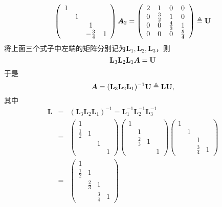 \begin{jie}
  $$
  \left(
    \begin{array}{cccc}
      1 & && \\
        &1&&\\
        &&1&\\
        &&-\frac34&1
    \end{array}
  \right)\boldsymbol{A}_2 = \left(
    \begin{array}{cccc}
      2 & 1 & 0 & 0\\
      0 & \frac32 & 1 & 0\\
      0 & 0 & \frac43 & 1\\
      0 & 0 & 0  & \frac54
    \end{array}
  \right) \triangleq \mathbf{U}
  $$
  将上面三个式子中左端的矩阵分别记为$\mathbf{L}_1,\mathbf{L}_2,\mathbf{L}_3$，则
  $$
  \mathbf{L}_3\mathbf{L}_2\mathbf{L}_1 \boldsymbol{A} = \mathbf{U}
  $$
  于是
  $$
  \boldsymbol{A} = (\mathbf{L}_3\mathbf{L}_2\mathbf{L}_1)^{-1}\mathbf{U} \triangleq \mathbf{L}\mathbf{U},
  $$
  其中
  $$
  \begin{array}{rcl}
    \mathbf{L}
    &=& (\mathbf{L}_3\mathbf{L}_2\mathbf{L}_1)^{-1} 
        =  \mathbf{L}_1^{-1}\mathbf{L}_2^{-1}\mathbf{L}_3^{-1}\\[0.2cm]
    &=&  
        \left(
        \begin{array}{cccc}
          1 & && \\
          \frac12 &1&&\\
            &&1&\\
            &&&1
        \end{array}
                \right)
                \left(
                \begin{array}{cccc}
                  1 & && \\
                    &1&&\\
                    &\frac23&1&\\
                    &&&1
                \end{array}
                        \right)
                        \left(
                        \begin{array}{cccc}
                          1 & && \\
                            &1&&\\
                            &&1&\\
                            &&\frac34&1
                        \end{array}
                                       \right) \\[0.6cm]
    &=&   \left(
        \begin{array}{cccc}
          1 & && \\
          \frac12 &1&&\\
            &\frac23&1&\\
            &&\frac34&1
        \end{array}
                       \right)
  \end{array}    
  $$
\end{jie}




